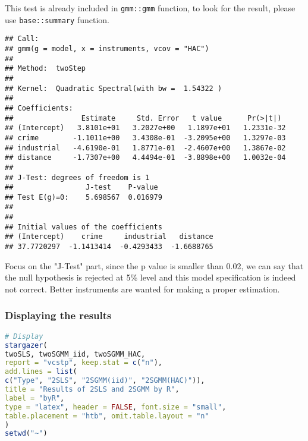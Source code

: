 \documentclass{article}
\theoremstyle{definition}
\begin{document}
This test is already included in \texttt{gmm::gmm} function, to look for the result, please use \texttt{base::summary} function.

\begin{verbatim}
## Call:
## gmm(g = model, x = instruments, vcov = "HAC")
##
## Method:  twoStep 
## 
## Kernel:  Quadratic Spectral(with bw =  1.54322 )
## 
## Coefficients:
##                Estimate     Std. Error   t value      Pr(>|t|)   
## (Intercept)   3.8101e+01   3.2027e+00   1.1897e+01   1.2331e-32
## crime        -1.1011e+00   3.4308e-01  -3.2095e+00   1.3297e-03
## industrial   -4.6190e-01   1.8771e-01  -2.4607e+00   1.3867e-02
## distance     -1.7307e+00   4.4494e-01  -3.8898e+00   1.0032e-04
##
## J-Test: degrees of freedom is 1 
##                 J-test    P-value 
## Test E(g)=0:    5.698567  0.016979
##
## 
## Initial values of the coefficients
## (Intercept)    crime     industrial   distance 
## 37.7720297  -1.1413414  -0.4293433  -1.6688765 
\end{verbatim}

Focus on the "J-Test" part, since the p value is smaller than 0.02, we can say that the null hypothesis is rejected at 5\% level and this model specification is indeed not correct. Better instruments are wanted for making a proper estimation.


\subsubsection{Displaying the results}
\begin{lstlisting}[language = R]
# Display
stargazer(
twoSLS, twoSGMM_iid, twoSGMM_HAC,
report = "vcstp", keep.stat = c("n"),
add.lines = list(
c("Type", "2SLS", "2SGMM(iid)", "2SGMM(HAC)")),
title = "Results of 2SLS and 2SGMM by R",
label = "byR",
type = "latex", header = FALSE, font.size = "small",
table.placement = "htb", omit.table.layout = "n"
)
setwd("~")
\end{lstlisting}
\end{document}
